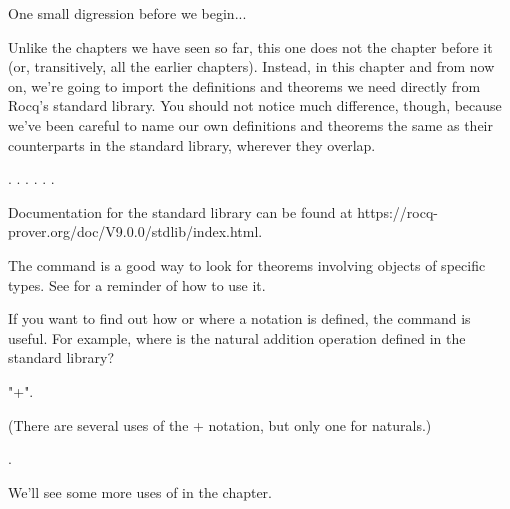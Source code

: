 \documentclass[12pt]{report}
\begin{document}
 One small digression before we begin...


    Unlike the chapters we have seen so far, this one does not
      the chapter before it (or, transitively, all the
    earlier chapters).  Instead, in this chapter and from now on,
    we're going to import the definitions and theorems we need
    directly from Rocq's standard library.  You should not notice much
    difference, though, because we've been careful to name our own
    definitions and theorems the same as their counterparts in the
    standard library, wherever they overlap. 
\begin{coqdoccode}
\coqdocemptyline
\coqdocnoindent
{}    .\coqdoceol
\coqdocnoindent
{}    .\coqdoceol
\coqdocnoindent
{}    .\coqdoceol
\coqdocnoindent
{}    .\coqdoceol
\coqdocnoindent
{}    .\coqdoceol
\coqdocnoindent
{} .\coqdoceol
\coqdocemptyline
\end{coqdoccode}
Documentation for the standard library can be found at
    https://rocq-prover.org/doc/V9.0.0/stdlib/index.html.


    The  command is a good way to look for theorems involving
    objects of specific types. See  for a reminder of how
    to use it. 

 If you want to find out how or where a notation is defined, the
     command is useful.  For example, where is the natural
    addition operation defined in the standard library? 
\begin{coqdoccode}
\coqdocemptyline
\coqdocnoindent
{} "+".\coqdoceol
\coqdocemptyline
\end{coqdoccode}
(There are several uses of the + notation, but only one for
    naturals.) 
\begin{coqdoccode}
\coqdocemptyline
\coqdocnoindent
{} .\coqdoceol
\coqdocemptyline
\end{coqdoccode}
We'll see some more uses of  in the  chapter. 
\begin{coqdoccode}
\coqdocemptyline
\end{coqdoccode}
\end{document}
